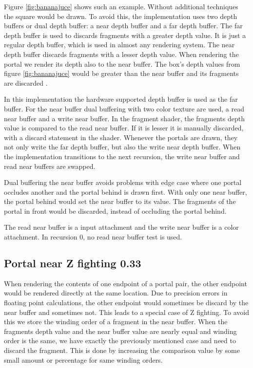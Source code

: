 Figure \ref{fig:bananajuce} shows such an example. Without additional techniques the square would be drawn. To avoid this, the implementation uses two depth buffers or dual depth buffer: a near depth buffer and a far depth buffer. The far depth buffer is used to discards fragments with a greater depth value. It is just a regular depth buffer, which is used in almost any rendering system. The near depth buffer discards fragments with a lesser depth value. When rendering the portal we render its depth also to the near buffer. The box's depth values from figure \ref{fig:bananajuce} would be greater than the near buffer and its fragments are discarded \cite{lowe:2005:technique}.

In this implementation the hardware supported depth buffer is used as the far buffer. For the near buffer dual buffering with two color texture are used, a read near buffer and a write near buffer. In the fragment shader, the fragments depth value is compared to the read near buffer. If it is lesser it is manually discarded, with a discard statement in the shader. Whenever the portals are drawn, they not only write the far depth buffer, but also the write near depth buffer. When the implementation transitions to the next recursion, the write near buffer and read near buffers are swapped.

Dual buffering the near buffer avoids problems with edge case where one portal occludes another and the portal behind is drawn first. With only one near buffer, the portal behind would set the near buffer to its value. The fragments of the portal in front would be discarded, instead of occluding the portal behind.

The read near buffer is a input attachment and the write near buffer is a color attachment. In recursion 0, no read near buffer test is used.

\subsection{Portal near Z fighting 0.33}
When rendering the contents of one endpoint of a portal pair, the other endpoint would be rendered directly at the same location. Due to precision errors in floating point calculations, the other endpoint would sometimes be discard by the near buffer and sometimes not. This leads to a special case of Z fighting. To avoid this we store the winding order of a fragment in the near buffer. When the fragments depth value and the near buffer value are nearly equal and winding order is the same, we have exactly the previously mentioned case and need to discard the fragment. This is done by increasing the comparison value by some small amount or percentage for same winding orders.

